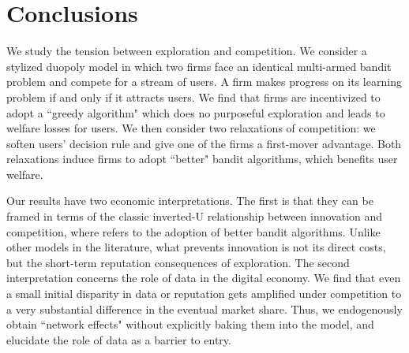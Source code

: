 \documentclass[../competing_bandits.tex]{subfiles}
\begin{document}
\section{Conclusions}\label{sec:conclusion}

We study the tension between exploration and competition. We consider a stylized duopoly model in which two firms face an identical multi-armed bandit problem and compete for a stream of users. A firm makes progress on its learning problem if and only if it attracts users. 
We find that firms are incentivized to adopt a ``greedy algorithm" which does no purposeful exploration and leads to welfare losses for users. We then consider two relaxations of competition: we soften users' decision rule and give one of the firms a first-mover advantage. Both relaxations induce firms to adopt ``better" bandit algorithms, which benefits user welfare.


Our results have two economic interpretations. The first is that they can be framed in terms of the classic inverted-U relationship between innovation and competition, where \innovation refers to the adoption of better bandit algorithms. Unlike other models in the literature, what prevents innovation is not its direct costs, but the short-term reputation consequences of exploration. The second interpretation concerns the role of data in the digital economy. We find that even a small initial disparity in data or reputation gets amplified under competition to a very substantial difference in the eventual market share. Thus, we endogenously obtain ``network effects" without explicitly baking them into the model, and elucidate the role of data as a barrier to entry.
\end{document}
